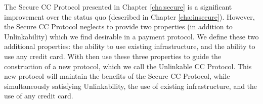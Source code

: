 The Secure CC Protocol presented in Chapter \ref{cha:secure} is a significant improvement over the status quo (described in Chapter \ref{cha:insecure}).
However, the Secure CC Protocol neglects to provide two properties (in addition to Unlinkability) which we find desirable in a payment protocol.
We define these two additional properties:
  the ability to use existing infrastructure, and the ability to use any credit card.
With then use these three properties to guide the construction of a new protocol, which we call the Unlinkable CC Protocol.
This new protocol will maintain the benefits of the Secure CC Protocol, while simultaneously satisfying Unlinkability, the use of existing infrastructure, and the use of any credit card.
